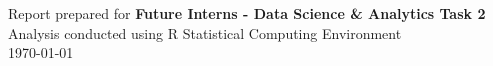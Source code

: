 \documentclass[11pt,a4paper]{article}
\begin{document}
\vspace{1cm}

\begin{center}

\vspace{6pt}

{\color{primary}\small Report prepared for \textbf{Future Interns - Data Science \& Analytics Task 2}}\\[4pt]
{\color{primary}\small Analysis conducted using R Statistical Computing Environment}\\[4pt]
{\color{primary}\small \today}
\end{center}
\end{document}
